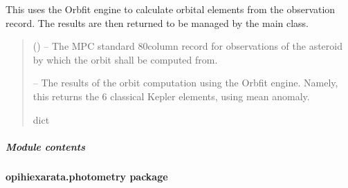 \documentclass[letterpaper,11pt,english]{sphinxmanual}
\begin{document}
\begin{savenotes}\begin{fulllineitems}
\label{\detokenize{code/opihiexarata.orbit.solution:opihiexarata.orbit.solution._vehicle_orbfit_orbit_determiner}}
\pysigstartsignatures
{}
\pysigstopsignatures
\sphinxAtStartPar
This uses the Orbfit engine to calculate orbital elements from the
observation record. The results are then returned to be managed by
the main class.
\begin{quote}\begin{description}
\sphinxAtStartPar
{} () – The MPC standard 80\sphinxhyphen{}column record for observations of the asteroid
by which the orbit shall be computed from.

\sphinxAtStartPar
{} – The results of the orbit computation using the Orbfit engine. Namely,
this returns the 6 classical Kepler elements, using mean anomaly.

\sphinxAtStartPar
dict

\end{description}\end{quote}

\end{fulllineitems}\end{savenotes}



\subparagraph{Module contents}
\label{\detokenize{code/opihiexarata.orbit:module-opihiexarata.orbit}}\label{\detokenize{code/opihiexarata.orbit:module-contents}}
\sphinxstepscope


\paragraph{opihiexarata.photometry package}
\label{\detokenize{code/opihiexarata.photometry:opihiexarata-photometry-package}}\label{\detokenize{code/opihiexarata.photometry::doc}}
\end{document}

